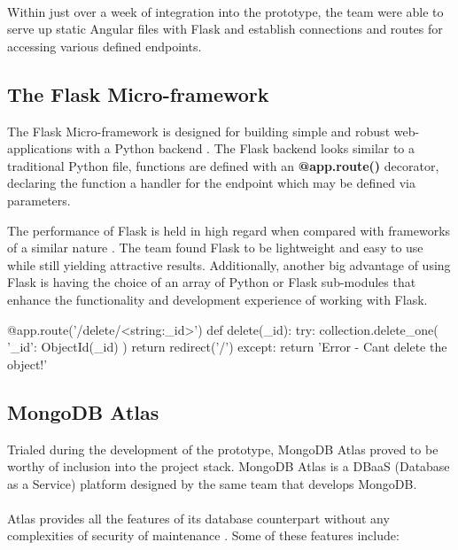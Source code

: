 \paragraph{}
Within just over a week of integration into the prototype, the team were able to serve up static Angular files with Flask and establish connections and routes for accessing various defined endpoints.

\subsection{The Flask Micro-framework}
The Flask Micro-framework is designed for building simple and robust web-applications with a Python backend \cite{FLASK}. The Flask backend looks similar to a traditional Python file, functions are defined with an \textbf{@app.route()} decorator, declaring the function a handler for the endpoint which may be defined via parameters.

The performance of Flask is held in high regard when compared with frameworks of a similar nature \cite{FLASK_USAGE}. The team found Flask to be lightweight and easy to use while still yielding attractive results. Additionally, another big advantage of using Flask is having the choice of an array of Python or Flask sub-modules that enhance the functionality and development experience of working with Flask. 

\begin{python}[caption=Sample Route Definition with Flask]
@app.route('/delete/<string:_id>')
def delete(_id):
    try: 
        collection.delete_one( {'_id': ObjectId(_id) } ) 
        return redirect('/')
    except:
        return 'Error - Cant delete the object!'
\end{python}

\subsection{MongoDB Atlas}
Trialed during the development of the prototype, MongoDB Atlas proved to be worthy of inclusion into the project stack. MongoDB Atlas is a DBaaS (Database as a Service) platform designed by the same team that develops MongoDB. 

\paragraph{}
Atlas provides all the features of its database counterpart without any complexities of security of maintenance \cite{MONGO_ATLAS}. Some of these features include:

